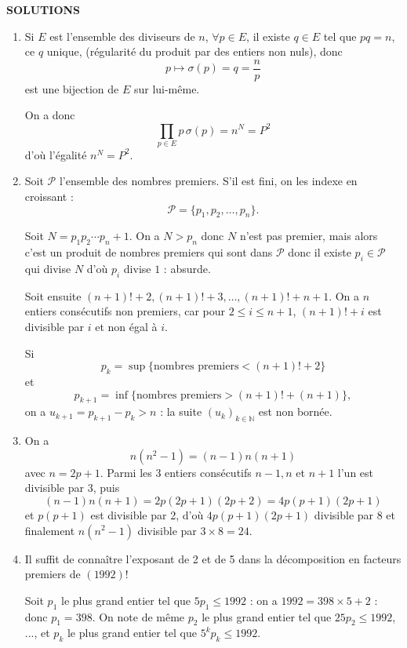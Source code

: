 \clearpage
\begin{center}
{\Large\sffamily\bfseries\color{BellaLavenderDeep} SOLUTIONS}
\end{center}
\vspace{0.8em}

\begin{enumerate}[label=\arabic*.,leftmargin=2.2em,itemsep=1.2em]
\item Si $E$ est l'ensemble des diviseurs de $n$, $\forall p\in E$, il existe $q\in E$ tel que $pq=n$, ce $q$ unique, (régularité du produit par des entiers non nuls), donc
\[
p\longmapsto\sigma(p)=q=\frac np
\]
est une bijection de $E$ sur lui-même.

On a donc
\[
\prod_{p\in E}p\,\sigma(p)=n^N=P^2
\]
d'où l'égalité $n^N=P^2$.

\item Soit $\mathcal P$ l'ensemble des nombres premiers. S'il est fini, on les indexe en croissant :
\[
\mathcal P=\{p_1,p_2,\ldots,p_n\}.
\]

Soit $N=p_1p_2\cdots p_n+1$. On a $N>p_n$ donc $N$ n'est pas premier, mais alors c'est un produit de nombres premiers qui sont dans $\mathcal P$ donc il existe $p_i\in\mathcal P$ qui divise $N$ d'où $p_i$ divise $1$ : absurde.

Soit ensuite $(n+1)!+2,(n+1)!+3,\ldots,(n+1)!+n+1$. On a $n$ entiers consécutifs non premiers, car pour $2\le i\le n+1$, $(n+1)!+i$ est divisible par $i$ et non égal à $i$.

Si
\[
p_k=\sup\{\text{nombres premiers}< (n+1)!+2\}
\]
et
\[
p_{k+1}=\inf\{\text{nombres premiers}> (n+1)!+(n+1)\},
\]
on a $u_{k+1}=p_{k+1}-p_k>n$ : la suite $(u_k)_{k\in\mathbb N}$ est non bornée.

\item On a
\[
n(n^2-1)=(n-1)n(n+1)
\]
avec $n=2p+1$. Parmi les 3 entiers consécutifs $n-1,n$ et $n+1$ l'un est divisible par 3, puis
\[
(n-1)n(n+1)=2p(2p+1)(2p+2)=4p(p+1)(2p+1)
\]
et $p(p+1)$ est divisible par 2, d'où $4p(p+1)(2p+1)$ divisible par 8 et finalement $n(n^2-1)$ divisible par $3\times8=24$.

\item Il suffit de connaître l'exposant de 2 et de 5 dans la décomposition en facteurs premiers de $(1992)!$

Soit $p_1$ le plus grand entier tel que $5p_1\le1992$ : on a $1992=398\times5+2$ : donc $p_1=398$. On note de même $p_2$ le plus grand entier tel que $25p_2\le1992$, ..., et $p_k$ le plus grand entier tel que $5^kp_k\le1992$.


\end{enumerate}
